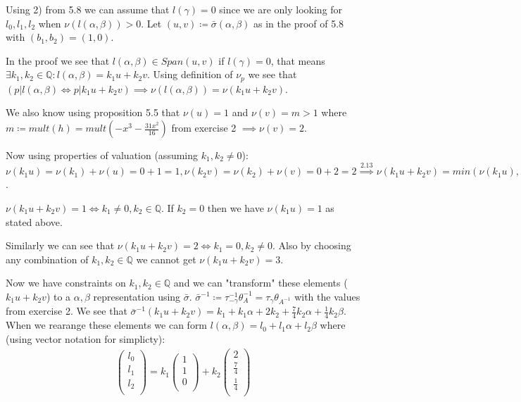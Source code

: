 \documentclass[12pt, a4paper]{article}
\begin{document}
Using 2) from 5.8 we can assume that $l(\gamma)=0$ since we are only looking for $l_0,l_1,l_2$ when $\nu(l(\alpha,\beta))>0$. Let $(u,v) \coloneqq \bar{\sigma}(\alpha,\beta)$ as in the proof of 5.8 with $(b_1,b_2) = (1,0)$. 

In the proof we see that $l(\alpha,\beta) \in Span(u,v)$ if $l(\gamma)=0$, that means $\exists k_1,k_2 \in \mathbb{Q}: l(\alpha, \beta) = k_1u + k_2v$. Using definition of $\nu_p$ we see that $(p | l(\alpha,\beta) \iff p| k_1u+k_2v) \implies \nu(l(\alpha, \beta))=\nu(k_1u+k_2v)$. 

We also know using proposition 5.5 that $\nu(u)=1$ and $\nu(v)=m>1$ where $m \coloneqq mult(h) = mult(-x^3-\frac{31 x^2}{16})$ from exercise 2 $\implies \nu(v)=2$.

Now using properties of valuation (assuming $k_1,k_2 \neq 0$): $\nu(k_1u)=\nu(k_1)+\nu(u) = 0 + 1 = 1, \nu(k_2v)=\nu(k_2)+\nu(v) = 0 + 2 = 2 \stackrel{2.13}{\implies} \nu(k_1u+k_2v) = min(\nu(k_1u),\nu(k_2v)) = min(1,2) = 1$.

$\nu(k_1u+k_2v) = 1 \iff k_1 \neq 0, k_2 \in \mathbb{Q}$. If $k_2=0$ then we have $\nu(k_1u)=1$ as stated above.

Similarly we can see that $\nu(k_1u+k_2v) = 2 \iff k_1 = 0, k_2 \neq 0$. Also by choosing any combination of $k_1,k_2 \in \mathbb{Q}$ we cannot get $\nu(k_1u+k_2v) = 3$.

Now we have constraints on $k_1,k_2 \in \mathbb{Q}$ and we can "transform" these elements ($k_1u+k_2v$) to a $\alpha, \beta$ representation using $\bar{\sigma}$. $\bar{\sigma}^{-1} \coloneqq \tau^{-1}_{-\gamma} \theta^{-1}_{A} = \tau_{\gamma}\theta_{A^{-1}}$ with the values from exercise 2. We see that $\bar{\sigma}^{-1}(k_1u+k_2v) = k_1+k_1\alpha+2k_2+\frac{7}{4}k_2\alpha + \frac{1}{4}k_2\beta $. When we rearange these elements we can form $l(\alpha,\beta) = l_0 + l_1\alpha + l_2\beta$ where (using vector notation for simplicty):
\begin{gather*}
\begin{pmatrix}
l_0\\
l_1\\
l_2\\
\end{pmatrix} = k_1\begin{pmatrix}
1\\
1\\
0\\
\end{pmatrix} + k_2\begin{pmatrix}
2\\
\frac{7}{4}\\
\frac{1}{4}\\
\end{pmatrix}
\end{gather*}
\end{document}
